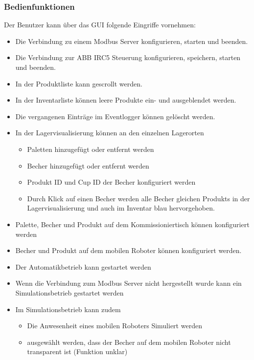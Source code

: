 \subsubsection{Bedienfunktionen}
Der Benutzer kann über das GUI folgende Eingriffe vornehmen:\\
\begin{itemize}
    \item Die Verbindung zu einem Modbus Server konfigurieren, starten und beenden.
    \item Die Verbindung zur ABB IRC5 Steuerung konfigurieren, speichern, starten und beenden.
    \item In der Produktliste kann gescrollt werden.
    \item In der Inventarliste können leere Produkte ein- und ausgeblendet werden.
    \item Die vergangenen Einträge im Eventlogger können gelöscht werden.
    \item In der Lagervisualisierung können an den einzelnen Lagerorten
    \begin{itemize}
        \item Paletten hinzugefügt oder entfernt werden
        \item Becher hinzugefügt oder entfernt werden
        \item Produkt ID und Cup ID der Becher konfiguriert werden
        \item Durch Klick auf einen Becher werden alle Becher gleichen Produkts in der Lagervisualisierung und auch im
        Inventar blau hervorgehoben.
    \end{itemize}
    \item Palette, Becher und Produkt auf dem Kommissioniertisch können konfiguriert werden
    \item Becher und Produkt auf dem mobilen Roboter können konfiguriert werden.
    \item Der Automatikbetrieb kann gestartet werden
    \item Wenn die Verbindung zum Modbus Server nicht hergestellt wurde kann ein Simulationsbetrieb gestartet werden
    \item Im Simulationsbetrieb kann zudem
    \begin{itemize}
        \item Die Anwesenheit eines mobilen Roboters Simuliert werden
        \item ausgewählt werden, dass der Becher auf dem mobilen Roboter nicht transparent ist (Funktion unklar)
    \end{itemize}
\end{itemize}

